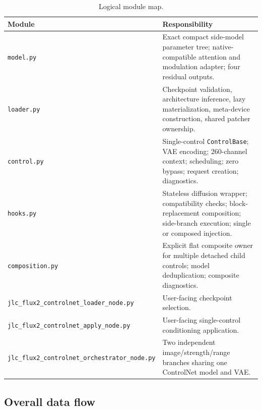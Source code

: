 \documentclass[11pt]{article}
\newcommand{\code}[1]{\texttt{#1}}
\begin{document}
\begin{table}[H]
\centering
\caption{Logical module map.}
\begin{tabularx}{\textwidth}{@{}lX@{}}
\toprule
Module & Responsibility \\
\midrule
\code{model.py} & Exact compact side-model parameter tree; native-compatible attention and modulation adapter; four residual outputs. \\
\code{loader.py} & Checkpoint validation, architecture inference, lazy materialization, meta-device construction, shared patcher ownership. \\
\code{control.py} & Single-control \code{ControlBase}; VAE encoding; 260-channel context; scheduling; zero bypass; request creation; diagnostics. \\
\code{hooks.py} & Stateless diffusion wrapper; compatibility checks; block-replacement composition; side-branch execution; single or composed injection. \\
\code{composition.py} & Explicit flat composite owner for multiple detached child controls; model deduplication; composite diagnostics. \\
\code{jlc\_flux2\_controlnet\_loader\_node.py} & User-facing checkpoint selection. \\
\code{jlc\_flux2\_controlnet\_apply\_node.py} & User-facing single-control conditioning application. \\
\code{jlc\_flux2\_controlnet\_orchestrator\_node.py} & Two independent image/strength/range branches sharing one ControlNet model and VAE. \\
\bottomrule
\end{tabularx}
\end{table}

\subsection{Overall data flow}
\end{document}
